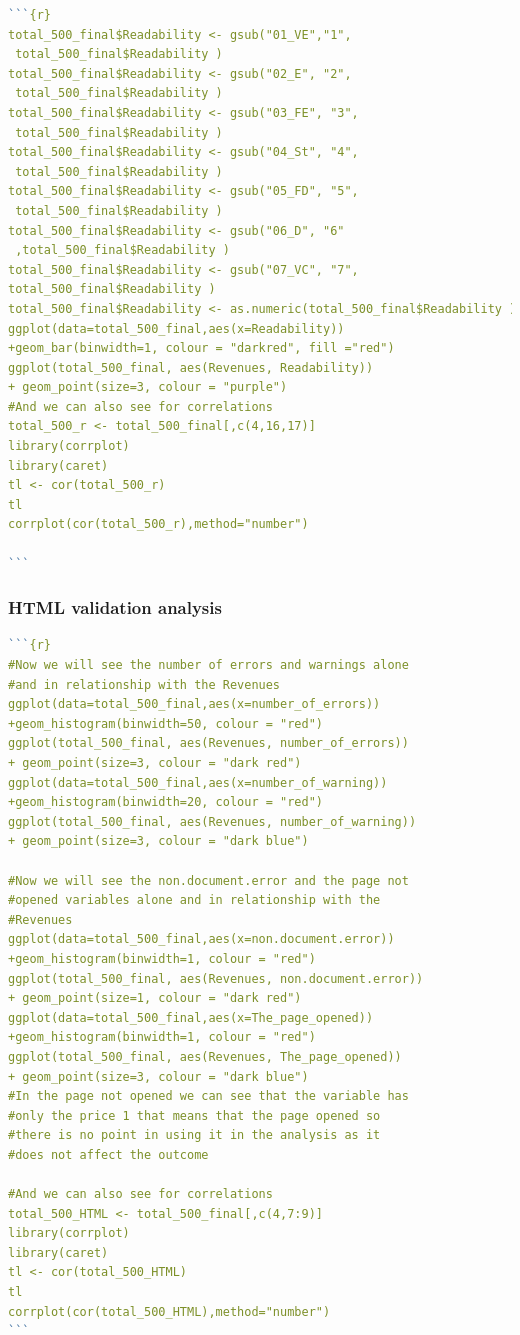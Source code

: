 \documentclass{book}
\begin{document}
\begin{lstlisting}[language=R]
```{r}
total_500_final$Readability <- gsub("01_VE","1",
 total_500_final$Readability )
total_500_final$Readability <- gsub("02_E", "2",
 total_500_final$Readability )
total_500_final$Readability <- gsub("03_FE", "3",
 total_500_final$Readability )
total_500_final$Readability <- gsub("04_St", "4",
 total_500_final$Readability )
total_500_final$Readability <- gsub("05_FD", "5",
 total_500_final$Readability )
total_500_final$Readability <- gsub("06_D", "6"
 ,total_500_final$Readability )
total_500_final$Readability <- gsub("07_VC", "7",
total_500_final$Readability )
total_500_final$Readability <- as.numeric(total_500_final$Readability )
ggplot(data=total_500_final,aes(x=Readability))
+geom_bar(binwidth=1, colour = "darkred", fill ="red")
ggplot(total_500_final, aes(Revenues, Readability)) 
+ geom_point(size=3, colour = "purple")
#And we can also see for correlations
total_500_r <- total_500_final[,c(4,16,17)]
library(corrplot)
library(caret)
tl <- cor(total_500_r)
tl
corrplot(cor(total_500_r),method="number")

```
 \end{lstlisting} 


\subsubsection{HTML validation analysis}\label{r: van: HTML}
\begin{lstlisting}[language=R]  
```{r}
#Now we will see the number of errors and warnings alone 
#and in relationship with the Revenues
ggplot(data=total_500_final,aes(x=number_of_errors))
+geom_histogram(binwidth=50, colour = "red")
ggplot(total_500_final, aes(Revenues, number_of_errors)) 
+ geom_point(size=3, colour = "dark red")
ggplot(data=total_500_final,aes(x=number_of_warning))
+geom_histogram(binwidth=20, colour = "red")
ggplot(total_500_final, aes(Revenues, number_of_warning)) 
+ geom_point(size=3, colour = "dark blue")

#Now we will see the non.document.error and the page not 
#opened variables alone and in relationship with the 
#Revenues
ggplot(data=total_500_final,aes(x=non.document.error))
+geom_histogram(binwidth=1, colour = "red")
ggplot(total_500_final, aes(Revenues, non.document.error)) 
+ geom_point(size=1, colour = "dark red")
ggplot(data=total_500_final,aes(x=The_page_opened))
+geom_histogram(binwidth=1, colour = "red")
ggplot(total_500_final, aes(Revenues, The_page_opened)) 
+ geom_point(size=3, colour = "dark blue")
#In the page not opened we can see that the variable has 
#only the price 1 that means that the page opened so 
#there is no point in using it in the analysis as it 
#does not affect the outcome

#And we can also see for correlations
total_500_HTML <- total_500_final[,c(4,7:9)]
library(corrplot)
library(caret)
tl <- cor(total_500_HTML)
tl
corrplot(cor(total_500_HTML),method="number")
```
\end{lstlisting} 
\end{document}
